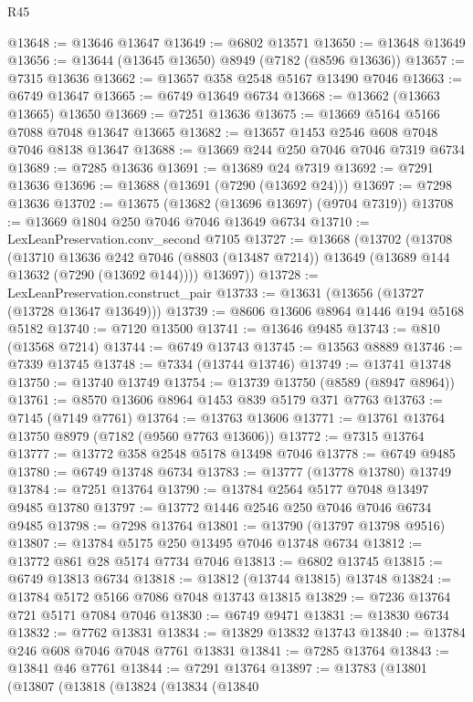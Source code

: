 \begin{lexlean}{R45}
\begin{coremodule}
{@13648 := @13646 @13647
@13649 := @6802 @13571
@13650 := @13648 @13649
@13656 := @13644 (@13645 @13650) @8949 (@7182 (@8596 @13636))
@13657 := @7315 @13636
@13662 := @13657 @358 @2548 @5167 @13490 @7046
@13663 := @6749 @13647
@13665 := @6749 @13649 @6734
@13668 := @13662 (@13663 @13665) @13650
@13669 := @7251 @13636
@13675 := @13669 @5164 @5166 @7088 @7048 @13647 @13665
@13682 := @13657 @1453 @2546 @608 @7048 @7046 @8138 @13647
@13688 := @13669 @244 @250 @7046 @7046 @7319 @6734
@13689 := @7285 @13636
@13691 := @13689 @24 @7319
@13692 := @7291 @13636
@13696 := @13688 (@13691 (@7290 (@13692 @24)))
@13697 := @7298 @13636
@13702 := @13675 (@13682 (@13696 @13697) (@9704 @7319))
@13708 := @13669 @1804 @250 @7046 @7046 @13649 @6734
@13710 := LexLeanPreservation.conv_second @7105
@13727 := @13668
    (@13702
      (@13708
        (@13710
          @13636
          @242
          @7046
          (@8803 (@13487 @7214))
          @13649
          (@13689 @144 @13632 (@7290 (@13692 @144))))
        @13697))
@13728 := LexLeanPreservation.construct_pair
@13733 := @13631 (@13656 (@13727 (@13728 @13647 @13649)))
@13739 := @8606 @13606 @8964 @1446 @194 @5168 @5182
@13740 := @7120 @13500
@13741 := @13646 @9485
@13743 := @810 (@13568 @7214)
@13744 := @6749 @13743
@13745 := @13563 @8889
@13746 := @7339 @13745
@13748 := @7334 (@13744 @13746)
@13749 := @13741 @13748
@13750 := @13740 @13749
@13754 := @13739 @13750 (@8589 (@8947 @8964))
@13761 := @8570 @13606 @8964 @1453 @839 @5179 @371 @7763
@13763 := @7145 (@7149 @7761)
@13764 := @13763 @13606
@13771 := @13761 @13764 @13750 @8979 (@7182 (@9560 @7763 @13606))
@13772 := @7315 @13764
@13777 := @13772 @358 @2548 @5178 @13498 @7046
@13778 := @6749 @9485
@13780 := @6749 @13748 @6734
@13783 := @13777 (@13778 @13780) @13749
@13784 := @7251 @13764
@13790 := @13784 @2564 @5177 @7048 @13497 @9485 @13780
@13797 := @13772 @1446 @2546 @250 @7046 @7046 @6734 @9485
@13798 := @7298 @13764
@13801 := @13790 (@13797 @13798 @9516)
@13807 := @13784 @5175 @250 @13495 @7046 @13748 @6734
@13812 := @13772 @861 @28 @5174 @7734 @7046
@13813 := @6802 @13745
@13815 := @6749 @13813 @6734
@13818 := @13812 (@13744 @13815) @13748
@13824 := @13784 @5172 @5166 @7086 @7048 @13743 @13815
@13829 := @7236 @13764 @721 @5171 @7084 @7046
@13830 := @6749 @9471
@13831 := @13830 @6734
@13832 := @7762 @13831
@13834 := @13829 @13832 @13743
@13840 := @13784 @246 @608 @7046 @7048 @7761 @13831
@13841 := @7285 @13764
@13843 := @13841 @46 @7761
@13844 := @7291 @13764
@13897 := @13783
    (@13801
      (@13807
        (@13818
          (@13824
            (@13834
              (@13840
}
\end{coremodule}
\end{lexlean}
